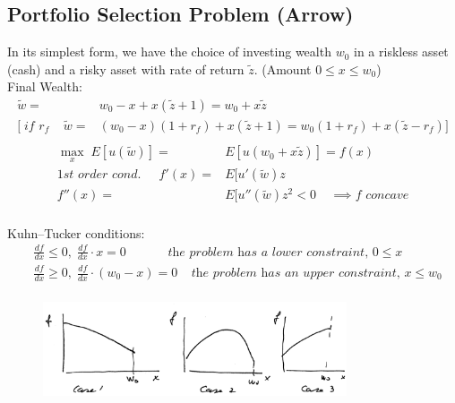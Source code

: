 \documentclass[
14pt,notheorems,hyperref={pdfauthor=whatever}
]{beamer}
\begin{document}
\subsection{Portfolio Selection Problem (Arrow)}
\begin{frame}
In its simplest form, we have the choice of investing wealth $w_0$ in a riskless asset (cash) and a risky asset with rate of return $\tilde z$. (Amount $0 \leq x \leq w_0$)\\
\hfill \break
Final Wealth:
\begin{align*}
    \tilde w =& w_0-x + x(\tilde z+1) = w_0 + x\tilde z\\
    \Bigg[\;\textit{if $r_f$}\;\;\;\; \tilde w =& (w_0-x)(1+r_f)+x(\tilde z+1) = w_0(1+r_f) + x(\tilde z - r_f) \Bigg]\\
\end{align*}
\begin{align*}
    \max_x \; E[u(\tilde w)] =& E[u(w_0+x\tilde z)] = f(x)\\
    \textit{1st order cond. }\;\;\;\; f'(x) =& E[u'(\tilde w)z\\
    f''(x) =& E[u''(\tilde w)z^2 < 0 \;\;\;\;\implies f \textit{ concave}\\
\end{align*}
\end{frame}

\begin{frame}
Kuhn–Tucker conditions:
\begin{align*}
    &\frac{df}{dx} \boldsymbol\leq 0,\;\frac{df}{dx}\cdot x=0 \;\;\;\;\;\;\;\;\;\;\;\;\textit{the problem has a lower constraint, $0\leq x$}\\
    &\frac{df}{dx} \boldsymbol\geq 0,\;\frac{df}{dx}\cdot (w_0-x)=0 \;\;\;\;\textit{the problem has an upper constraint, $x\leq w_0$}\\
\end{align*}
\begin{figure}[threecases]
    \includegraphics[width=0.8\textwidth]{L4-three-cases.png}
    \centering
\end{figure}
\end{frame}
\end{document}
